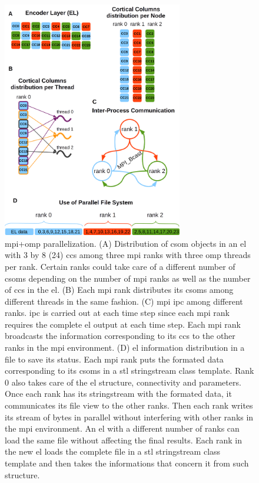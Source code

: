 \documentclass[10pt,letterpaper]{article}
\begin{document}
\begin{figure}[h!]
    \centering
    \includegraphics[width=0.7\textwidth]{EncoderParallelization.png}
    \caption{ \gls{mpi}+\gls{omp} parallelization. (A) Distribution of \gls{csom} objects in an \gls{el} with
    3 by 8 (24) \glspl{cc} among three \gls{mpi} ranks with three \gls{omp} threads per rank.
    Certain ranks could take care of a different number of
    \glspl{csom} depending on the number of \gls{mpi} ranks as well as the number of \glspl{cc} in the \gls{el}.
    (B) Each \gls{mpi} rank distributes its \glspl{csom} among different threads in the same fashion.
    (C) \gls{mpi} \gls{ipc} among different ranks. \gls{ipc} is carried out at each time step since each \gls{mpi} rank 
    requires the complete \gls{el} output at each time step.
    Each \gls{mpi} rank broadcasts the information corresponding to its \glspl{cc} to the other ranks in the \gls{mpi}
    environment.
    (D) \gls{el} information distribution in a file to save its status.
    Each \gls{mpi} rank puts the formated data corresponding to its \glspl{csom} in a \gls{stl} stringstream class template.
    Rank 0 also takes care of the \gls{el} structure, connectivity and parameters.
    Once each rank has its stringstream with the formated data, it communicates its file view to the other ranks.
    Then each rank writes its stream of bytes in parallel without interfering with other ranks in the \gls{mpi} environment.
    An \gls{el} with a different number of ranks can load the same file without affecting the final results.
    Each rank in the new \gls{el} loads the complete file in a \gls{stl} stringstream class template and then takes the
    informations that concern it from such structure.}
    \label{fig:EncoderParallelization}
\end{figure}
\end{document}
